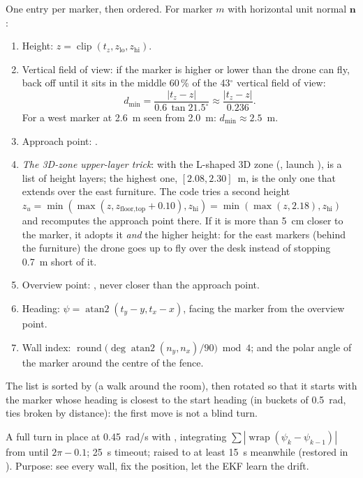 One entry per marker, then ordered. For marker $m$ with horizontal unit normal $\mathbf n$:
\begin{enumerate}[nosep]
  \item Height: $z = \operatorname{clip}(t_z, z_{\text{lo}}, z_{\text{hi}})$.
  \item Vertical field of view: if the marker is higher or lower than the drone can fly, back off until it sits
        in the middle 60\,\% of the 43$^\circ$ vertical field of view:
        $$ d_{\min} = \frac{|t_z - z|}{0.6\,\tan 21.5^\circ} \approx \frac{|t_z - z|}{0.236}. $$
        For a west marker at 2.6~m seen from 2.0~m: $d_{\min} \approx 2.5$~m.
  \item Approach point: .
  \item \emph{The 3D-zone upper-layer trick}: with the L-shaped 3D zone (,
        launch ),  is a list of height layers; the highest one,
        $[2.08, 2.30]$~m, is the only one that extends over the east furniture. The code tries a second height
        $z_u = \min(\max(z, z_{\text{floor,top}} + 0.10), z_{\text{hi}}) = \min(\max(z, 2.18), z_{\text{hi}})$
        and recomputes the approach point there. If it is more than 5~cm closer to the marker, it adopts it
        \emph{and} the higher height: for the east markers (behind the furniture) the drone goes up to fly over
        the desk instead of stopping 0.7~m short of it.
  \item Overview point: , never closer than the
        approach point.
  \item Heading: $\psi = \operatorname{atan2}(t_y - y, t_x - x)$, facing the marker from the overview point.
  \item Wall index: $\operatorname{round}\big(\deg\operatorname{atan2}(n_y,n_x)/90\big) \bmod 4$; and the polar
        angle  of the marker around the centre of the fence.
\end{enumerate}
The list is sorted by  (a walk around the room), then rotated so that it starts with the marker whose
heading is closest to the start heading  (in buckets of 0.5~rad, ties broken by distance): the first
move is not a blind turn.

A full turn in place at 0.45~rad/s with , integrating $\sum |\operatorname{wrap}(\psi_k -
\psi_{k-1})|$ from  until $2\pi - 0.1$; 25~s timeout;  raised to at least
15~s meanwhile (restored in ). Purpose: see every wall, fix the position, let the EKF learn the
drift.

